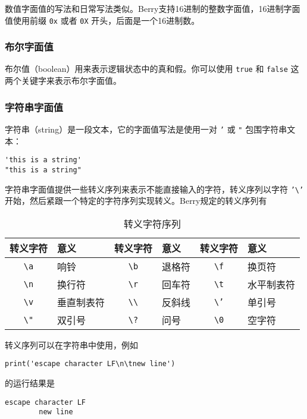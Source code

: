 数值字面值的写法和日常写法类似。Berry支持16进制的整数字面值，16进制字面值使用前缀 \texttt{0x} 或者 \texttt{0X} 开头，后面是一个16进制数。

\subsubsection{布尔字面值}

布尔值（boolean）用来表示逻辑状态中的真和假。你可以使用 \texttt{true} 和 \texttt{false} 这两个关键字来表示布尔字面值。

\subsubsection{字符串字面值}

字符串（string）是一段文本，它的字面值写法是使用一对 \texttt{'} 或 \texttt{"} 包围字符串文本：
\begin{lstlisting}[language=berry, numbers=none]
'this is a string'
"this is a string"
\end{lstlisting}

字符串字面值提供一些转义序列来表示不能直接输入的字符，转义序列以字符 \texttt{'\textbackslash'} 开始，然后紧跟一个特定的字符序列实现转义。Berry规定的转义序列有
\begin{table}[htb]
    \centering
    \setlength{\tabcolsep}{4mm}
    \begin{tabular}{clclcl} \toprule
        \textbf{转义字符} & \textbf{意义} & \textbf{转义字符} & \textbf{意义} & \textbf{转义字符} & \textbf{意义} \\ \midrule
        \texttt{\textbackslash a} & 响铃 & \texttt{\textbackslash b} & 退格符 & \texttt{\textbackslash f} & 换页符 \\
        \texttt{\textbackslash n} & 换行符 & \texttt{\textbackslash r} & 回车符 & \texttt{\textbackslash t} & 水平制表符 \\
        \texttt{\textbackslash v} & 垂直制表符 & \texttt{\textbackslash \textbackslash} & 反斜线 & \texttt{\textbackslash '} & 单引号 \\
        \texttt{\textbackslash "} & 双引号 & \texttt{\textbackslash ?} & 问号 & \texttt{\textbackslash 0} & 空字符 \\
        \bottomrule
    \end{tabular}
    \caption{转义字符序列}
    \label{tab::escape_character}
\end{table}

转义序列可以在字符串中使用，例如
\begin{lstlisting}[language=berry, numbers=none]
print('escape character LF\n\tnew line')
\end{lstlisting}
的运行结果是
\begin{lstlisting}[numbers=none]
escape character LF
        new line
\end{lstlisting}

